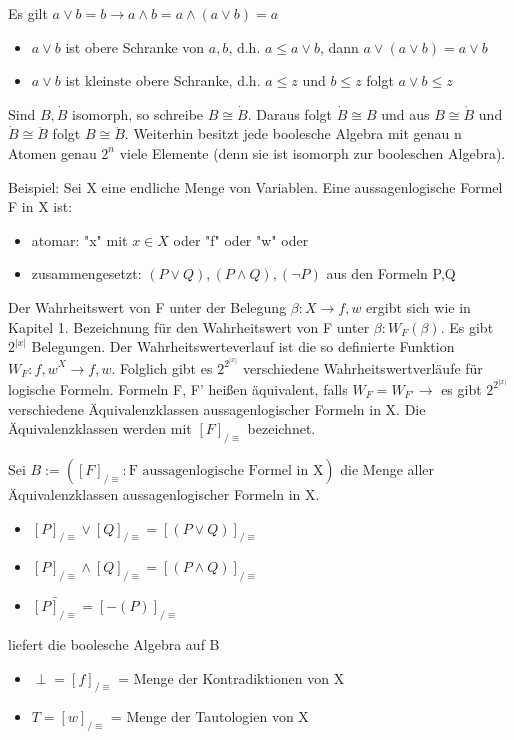 \documentclass[a4paper]{article}
\begin{document}
\begin{multicols}{3}
    Es gilt $a\vee b= b \rightarrow a\wedge b = a\wedge(a\vee b)= a$
    \begin{itemize}
        \item $a\vee b$ ist obere Schranke von ${a,b}$, d.h. $a\leq a\vee b$, dann $a\vee(a\vee b)=a\vee b$
        \item $a\vee b$ ist kleinste obere Schranke, d.h. $a\leq z$ und $b\leq z$ folgt $a\vee b \leq z$
    \end{itemize}
    
    Sind $B, \dot{B}$ isomorph, so schreibe $B \cong \dot{B}$. Daraus folgt $\dot{B} \cong B$ und aus $B \cong \dot{B}$ und $\dot{B} \cong \ddot{B}$ folgt $B \cong \ddot{B}$.
    Weiterhin besitzt jede boolesche Algebra mit genau n Atomen genau $2^n$ viele Elemente (denn sie ist isomorph zur booleschen Algebra).
    
    Beispiel: Sei X eine endliche Menge von Variablen. Eine aussagenlogische Formel F in X ist:
    \begin{itemize}
        \item atomar: "x" mit $x\in X$ oder "f" oder "w" oder
        \item zusammengesetzt: $(P\vee Q), (P \wedge Q), (\neg P)$ aus den Formeln P,Q
    \end{itemize}
    Der Wahrheitswert von F unter der Belegung $\beta: X\rightarrow {f,w}$ ergibt sich wie in Kapitel 1. Bezeichnung für den Wahrheitswert von F unter $\beta: W_F(\beta)$. Es gibt $2^{|x|}$ Belegungen.
    Der Wahrheitswerteverlauf ist die so definierte Funktion $W_F:{f,w}^X\rightarrow{f,w}$. Folglich gibt es $2^ {2^{|x|}}$ verschiedene Wahrheitswertverläufe für logische Formeln. Formeln F, F' heißen äquivalent, falls $W_F=W_{F'} \rightarrow$ es gibt $2^ {2^{|x|}}$ verschiedene Äquivalenzklassen aussagenlogischer Formeln in X. Die Äquivalenzklassen werden mit $[F]_{/\equiv}$ bezeichnet.
    
    Sei $B:=([F]_{/\equiv }: \text{F aussagenlogische Formel in X} )$ die Menge aller Äquivalenzklassen aussagenlogischer Formeln in X.
    \begin{itemize}
        \item $[P]_{/\equiv} \vee [Q]_{/\equiv} = [(P\vee Q)]_{/\equiv}$
        \item $[P]_{/\equiv} \wedge [Q]_{/\equiv} = [(P\wedge Q)]_{/\equiv}$
        \item $\bar{[P]_{/\equiv}} = [-(P)]_{/\equiv}$
    \end{itemize}
    liefert die boolesche Algebra auf B
    \begin{itemize}
        \item $\perp = [f]_{/\equiv}$ = Menge der Kontradiktionen von X
        \item $T = [w]_{/\equiv}$ = Menge der Tautologien von X
    \end{itemize}
    

\end{multicols}
\end{document}
